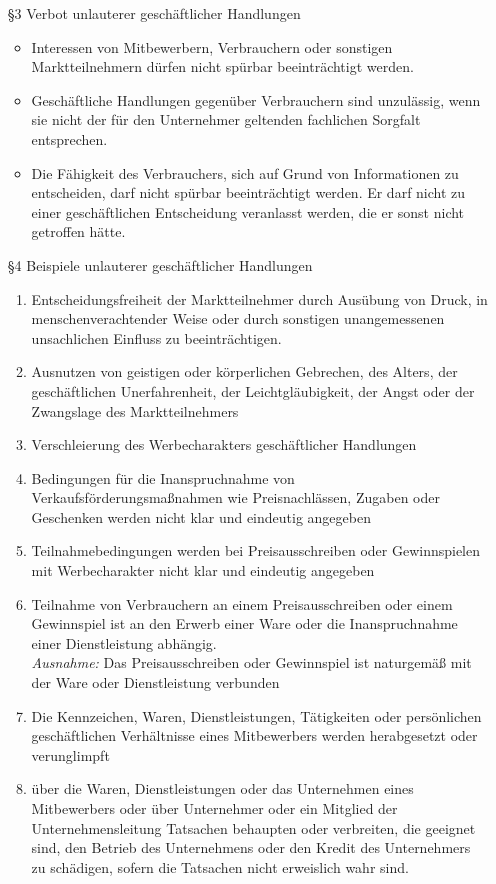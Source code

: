 \begin{itemize}
	\item[§3] Verbot unlauterer geschäftlicher Handlungen
	\begin{itemize}
		\item Interessen von Mitbewerbern, Verbrauchern oder sonstigen Marktteilnehmern dürfen nicht spürbar beeinträchtigt werden.
		\item Geschäftliche Handlungen gegenüber Verbrauchern sind unzulässig, wenn sie nicht der für den Unternehmer geltenden fachlichen Sorgfalt entsprechen.
		\item Die Fähigkeit des Verbrauchers, sich auf Grund von Informationen zu entscheiden, darf nicht spürbar beeinträchtigt werden. Er darf nicht zu einer geschäftlichen Entscheidung veranlasst werden, die er sonst nicht getroffen hätte.
	\end{itemize}
	\item[§4] Beispiele unlauterer geschäftlicher Handlungen
	\begin{enumerate}
		\item Entscheidungsfreiheit der Marktteilnehmer durch Ausübung von Druck, in menschenverachtender Weise oder durch sonstigen unangemessenen unsachlichen Einfluss zu beeinträchtigen.
		\item Ausnutzen von geistigen oder körperlichen Gebrechen, des Alters, der geschäftlichen Unerfahrenheit, der Leichtgläubigkeit, der Angst oder der Zwangslage des Marktteilnehmers
		\item Verschleierung des Werbecharakters geschäftlicher Handlungen
		\item Bedingungen für die Inanspruchnahme von Verkaufsförderungsmaßnahmen wie Preisnachlässen, Zugaben oder Geschenken werden nicht klar und eindeutig angegeben
		\item Teilnahmebedingungen werden bei Preisausschreiben oder Gewinnspielen mit Werbecharakter nicht klar und eindeutig angegeben
		\item Teilnahme von Verbrauchern an einem Preisausschreiben oder einem Gewinnspiel ist an den Erwerb einer Ware oder die Inanspruchnahme einer Dienstleistung abhängig. \\
{\it Ausnahme:} Das Preisausschreiben oder Gewinnspiel ist naturgemäß mit der Ware oder Dienstleistung verbunden
		\item Die Kennzeichen, Waren, Dienstleistungen, Tätigkeiten oder persönlichen geschäftlichen Verhältnisse eines Mitbewerbers werden herabgesetzt oder verunglimpft			
		\item über die Waren, Dienstleistungen oder das Unternehmen eines Mitbewerbers oder über Unternehmer oder ein Mitglied der Unternehmensleitung Tatsachen behaupten oder verbreiten, die geeignet sind, den Betrieb des Unternehmens oder den Kredit des Unternehmers zu schädigen, sofern die Tatsachen nicht erweislich wahr sind.

\end{enumerate}
\end{itemize}
